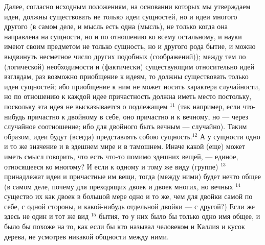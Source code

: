 \documentclass[oneside, 17pt, dvipsnames]{extbook}
\begin{document}
Далее, согласно исходным положениям, на основании которых мы утверждаем идеи, должны существовать не только идеи сущностей, но и идеи многого другого (в самом деле, и мысль есть одна (мысль), не только когда она направлена на сущности, но и по отношению ко всему остальному, и науки имеют своим предметом не только сущность, но и другого рода бытие, и можно выдвинуть несметное число других подобных (соображений)); между тем по (логической) необходимости и (фактически) существующим относительно идей взглядам, раз возможно приобщение к идеям, то должны существовать только идеи сущностей; ибо приобщение к ним не может носить характера случайности, но по отношению к каждой идее причастность должна иметь место постольку, поскольку эта идея не высказывается о подлежащем $^{11}$ (так например, если что-нибудь причастно к двойному в себе, оно причастно и к вечному, но — через случайное соотношение; ибо для двойного быть вечным — случайно). Таким образом, идеи будут (всегда) представлять собою сущность.$^{12}$
А у сущности одно и то же значение и в здешнем мире и в тамошнем. Иначе какой (еще) может иметь смысл говорить, что есть что-то помимо здешних вещей, — единое, относящееся ко многому? И если к одному и тому же виду (группе) $^{13}$ принадлежат идеи и причастные им вещи, тогда (между ними) будет нечто общее (в самом деле, почему для преходящих двоек и двоек многих, но вечных $^{14}$ существо их как двоек в большой мере одно и то же, чем для двойки самой по себе, с одной стороны, и какой-нибудь отдельной двойки — с другой?) Если же здесь не один и тот же вид $^{15}$ бытия, то у них было бы только одно имя общее, и было бы похоже на то, как если бы кто называл человеком и Каллия и кусок дерева, не усмотрев никакой общности между ними.
\end{document}
